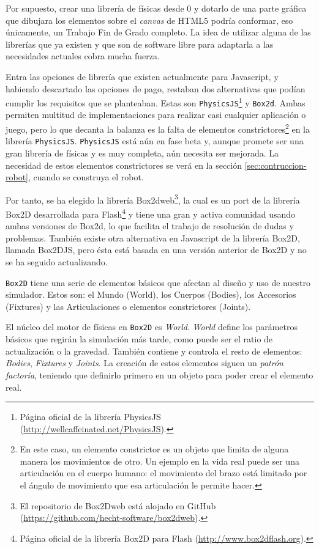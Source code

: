 Por supuesto, crear una librería de físicas desde 0 y dotarlo de una parte gráfica que dibujara los elementos sobre el \emph{canvas} de HTML5 podría conformar, eso únicamente, un Trabajo Fin de Grado completo. La idea de utilizar alguna de las librerías que ya existen y que son de software libre para adaptarla a las necesidades actuales cobra mucha fuerza. 

Entra las opciones de librería que existen actualmente para Javascript, y habiendo descartado las opciones de pago, restaban dos alternativas que podían cumplir los requisitos que se planteaban. Estas son \texttt{PhysicsJS}\footnote{Página oficial de la librería PhysicsJS (\url{http://wellcaffeinated.net/PhysicsJS}).} y \texttt{Box2d}\cite{box2d}. Ambas permiten multitud de implementaciones para realizar casi cualquier aplicación o juego, pero lo que decanta la balanza es la falta de  elementos constrictores\footnote{En este caso, un elemento constrictor es un objeto que limita de alguna manera los movimientos de otro. Un ejemplo en la vida real puede ser una articulación en el cuerpo humano: el movimiento del brazo está limitado por el ángulo de movimiento que esa articulación le permite hacer.} en la librería \texttt{PhysicsJS}. \texttt{PhysicsJS} está aún en fase beta y, aunque promete ser una gran librería de físicas y es muy completa, aún necesita ser mejorada. La necesidad de estos elementos constrictores se verá en la sección \ref{sec:contruccion-robot}, cuando se construya el robot.

Por tanto, se ha elegido la librería Box2dweb\footnote{El repositorio de Box2Dweb está alojado en GitHub (\url{https://github.com/hecht-software/box2dweb}).}, la cual es un port de la librería Box2D desarrollada para Flash\footnote{Página oficial de la librería Box2D para Flash (\url{http://www.box2dflash.org}).} y tiene una gran y activa comunidad usando ambas versiones de Box2d, lo que facilita el trabajo de resolución de dudas y problemas. También existe otra alternativa en Javascript de la librería Box2D, llamada Box2DJS, pero ésta está basada en una versión anterior de Box2D y no se ha seguido actualizando. 


\texttt{Box2D} tiene una serie de elementos básicos que afectan al diseño y uso de nuestro simulador. Estos son: el Mundo (World), los Cuerpos (Bodies), los Accesorios (Fixtures) y las Articulaciones o elementos constrictores (Joints).

El núcleo del motor de físicas en \texttt{Box2D} es \emph{World}. \emph{World} define los parámetros básicos que regirán la simulación más tarde, como puede ser el ratio de actualización o la gravedad. También contiene y controla el resto de elementos: \emph{Bodies}, \emph{Fixtures} y \emph{Joints}. La creación de estos elementos siguen un \emph{patrón factoría}, teniendo que definirlo primero en un objeto para poder crear el elemento real. 

